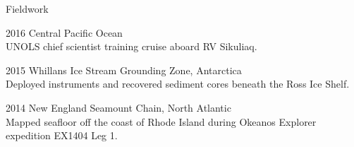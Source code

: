 \begin{cvlist}{Fieldwork} 

\item[2016] Central Pacific Ocean \\
UNOLS chief scientist training cruise aboard RV Sikuliaq. \\

\item[2015] Whillans Ice Stream Grounding Zone, Antarctica \\
Deployed instruments and recovered sediment cores beneath the Ross Ice Shelf. \\

\item[2014] New England Seamount Chain, North Atlantic \\
Mapped seafloor off the coast of Rhode Island during Okeanos Explorer expedition EX1404 Leg 1. \\


\end{cvlist}
